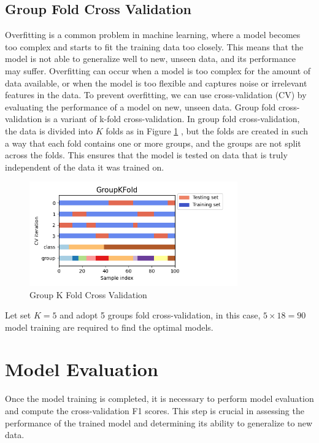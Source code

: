 \documentclass[11pt,a4paper]{article}
\begin{document}
    \subsection{Group Fold Cross Validation}
    Overfitting is a common problem in machine learning, where a model becomes too complex and starts to fit the training data too closely. This means that the model is not able to generalize well to new, unseen data, and its performance may suffer. Overfitting can occur when a model is too complex for the amount of data available, or when the model is too flexible and captures noise or irrelevant features in the data. To prevent overfitting, we can use cross-validation (CV) by evaluating the performance of a model on new, unseen data. Group fold cross-validation is a variant of k-fold cross-validation. In group fold cross-validation, the data is divided into $K$ folds as in Figure \ref{fig:group_k_fold} \cite{group_k_fold}, but the folds are created in such a way that each fold contains one or more groups, and the groups are not split across the folds. This ensures that the model is tested on data that is truly independent of the data it was trained on.
    
    \begin{figure}[H]
        \centering
        \includegraphics[width = 0.8\textwidth]{model_plot/sphx_glr_plot_cv_indices_004.png}
        \caption{Group K Fold Cross Validation}
        \label{fig:group_k_fold}
    \end{figure}

    \noindent
    Let set $K = 5$ and adopt 5 groups fold cross-validation, in this case, $5 \times 18 = 90$ model training are required to find the optimal models.

    \newpage
    \section{Model Evaluation}
    Once the model training is completed, it is necessary to perform model evaluation and compute the cross-validation F1 scores. This step is crucial in assessing the performance of the trained model and determining its ability to generalize to new data.
\end{document}

